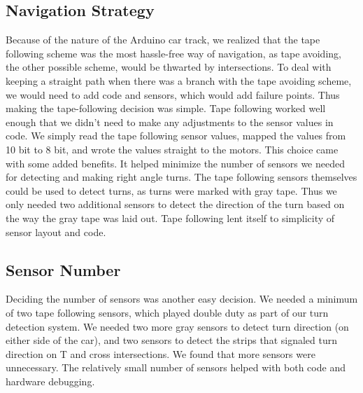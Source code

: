 \documentclass[12pt]{article}
\begin{document}
\subsection*{Navigation Strategy}
Because of the nature of the Arduino car track, we realized that the tape
following scheme was the most hassle-free way of navigation, as tape avoiding,
the other possible scheme, would be thwarted by intersections. To deal with
keeping a straight path when there was a branch with the tape avoiding scheme, we would need to add code and sensors, which would add failure points. Thus making
the tape-following decision was simple. Tape following worked well enough that we
didn't need to make any adjustments to the sensor values in code. We simply read
the tape following sensor values, mapped the values from 10 bit to 8 bit, and
wrote the values straight to the motors. This choice came with some added benefits. It helped minimize the number of sensors we needed for detecting and making
right angle turns. The tape following sensors themselves could be used to detect
turns, as turns were marked with gray tape. Thus we only needed two additional
sensors to detect the direction of the turn based on the way the gray tape was
laid out. Tape following lent itself to simplicity of sensor layout and code.

\subsection*{Sensor Number}
Deciding the number of sensors was another easy decision. We needed a minimum of
two tape following sensors, which played double duty as part of our turn
detection system. We needed two more gray sensors to detect turn direction (on
either side of the car), and two sensors to detect the strips that signaled
turn direction on T and cross intersections. We found that more sensors were
unnecessary. The relatively small number of sensors helped with both code
and hardware debugging.
\end{document}

